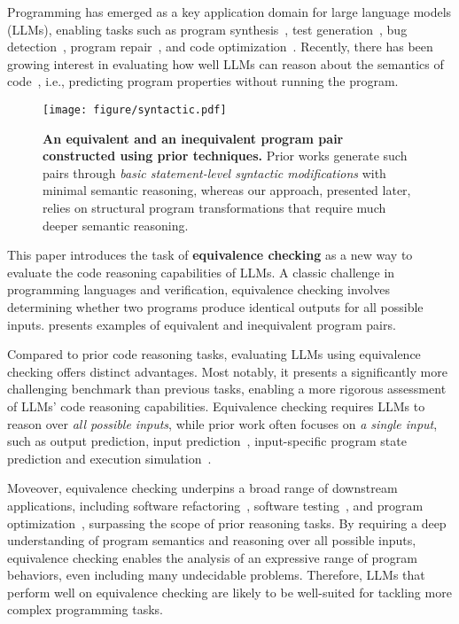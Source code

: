 Programming has emerged as a key application domain for large language models (LLMs), enabling tasks such as program synthesis~\cite{chen2021evaluating,austin2021program,jain2024livecodebench}, test generation~\cite{yang2024whitefox}, bug detection~\cite{yang2023kernelgpt}, program repair~\cite{xia2023automated}, and code optimization~\cite{shypula2023learning}. Recently, there has been growing interest in evaluating how well LLMs can reason about the semantics of code~\cite{ni2024next,liu2023code,gu2024cruxeval,chen2024reasoning,liu2024codemind}, i.e., predicting program properties without running the program.

\begin{figure}[!tb]
\centering
\texttt{[image: figure/syntactic.pdf]}
\caption{\textbf{An equivalent and an inequivalent program pair constructed using prior techniques.} Prior works generate such pairs through \emph{basic statement-level syntactic modifications} with minimal semantic reasoning, whereas our approach, presented later, relies on structural program transformations that require much deeper semantic reasoning.}
\label{fig:syntactic}
\end{figure}

This paper introduces the task of \textbf{equivalence checking} as a new way to evaluate the code reasoning capabilities of LLMs. A classic challenge in programming languages and verification, equivalence checking involves determining whether two programs produce identical outputs for all possible inputs.  presents examples of equivalent and inequivalent program pairs.


Compared to prior code reasoning tasks, evaluating LLMs using equivalence checking offers distinct advantages. Most notably, it presents a significantly more challenging benchmark than previous tasks, enabling a more rigorous assessment of LLMs' code reasoning capabilities. Equivalence checking requires LLMs to reason over \emph{all possible inputs}, while prior work often focuses on \emph{a single input}, such as output prediction, input prediction~\cite{gu2024cruxeval}, input-specific program state prediction and execution simulation~\cite{liu2023code,chen2024reasoning,ding2024semcoder,la2024code,ni2024next}.

Moveover, equivalence checking underpins a broad range of downstream applications, including software refactoring~\cite{pailoor2024semantic}, software testing~\cite{tian2024large}, and program optimization~\cite{shypula2021learning}, surpassing the scope of prior reasoning tasks. By requiring a deep understanding of program semantics and reasoning over all possible inputs, equivalence checking enables the analysis of an expressive range of program behaviors, even including many undecidable problems. Therefore, LLMs that perform well on equivalence checking are likely to be well-suited for tackling more complex programming tasks.

